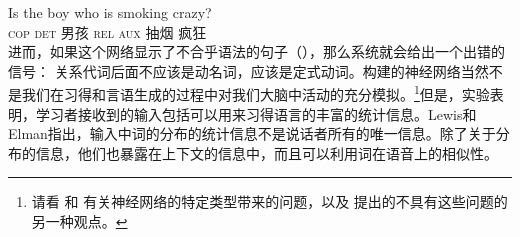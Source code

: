 \ea
\gll Is the boy who is smoking crazy?\\
\textsc{cop} \textsc{det} 男孩 \textsc{rel} \textsc{aux} 抽烟 疯狂\\
\z
进而，如果这个网络显示了不合乎语法的句子（），那么系统就会给出一个出错的信号：
\z
关系代词后面不应该是动名词，应该是定式动词。构建的神经网络当然不是我们在习得和言语生成的过程中对我们大脑中活动的充分模拟。\footnote{%
请看 \citet[]{Hurford2002a}和 \citet[\S~6.2]{Jackendoff2007a}有关神经网络的特定类型带来的问题，以及 \citet{Pulvermueller2003a,Pulvermueller2010a}提出的不具有这些问题的另一种观点。
}但是，实验表明，学习者接收到的输入包括可以用来习得语言的丰富的统计信息。Lewis和Elman指出，输入中词的分布的统计信息不是说话者所有的唯一信息。除了关于分布的信息，他们也暴露在上下文的信息中，而且可以利用词在语音上的相似性。

